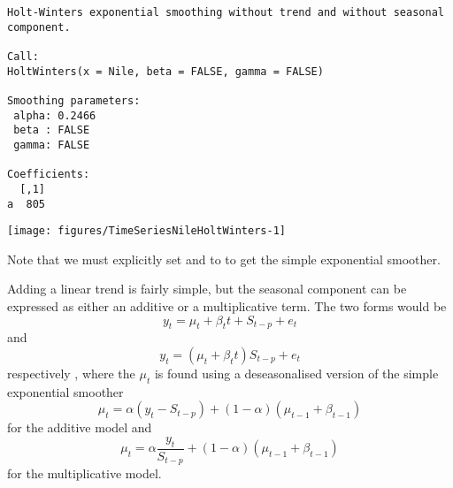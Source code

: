 \begin{knitrout}
\color{fgcolor}\begin{kframe}
\begin{alltt}
\hlstd{> } \hlkwb{=}  \hlstd{=}\hlstd{,}  \hlstd{=} \hlstd{)}
\hlstd{> }
\end{alltt}
\begin{verbatim}
Holt-Winters exponential smoothing without trend and without seasonal component.

Call:
HoltWinters(x = Nile, beta = FALSE, gamma = FALSE)

Smoothing parameters:
 alpha: 0.2466
 beta : FALSE
 gamma: FALSE

Coefficients:
  [,1]
a  805
\end{verbatim}
\begin{alltt}
\hlstd{> }
\end{alltt}
\end{kframe}
\texttt{[image: figures/TimeSeriesNileHoltWinters-1]} 

\end{knitrout}
Note that we must explicitly set  and  to  to get the simple exponential smoother. 
 
 
Adding a linear trend is fairly simple, but the seasonal component can be expressed as either an additive or a multiplicative term. The two forms would be 
$$y_t = \mu_t + \beta_t t +S_{t-p} + e_t$$ 
and 
$$y_t = (\mu_t + \beta_t t) S_{t-p} + e_t$$ 
respectively , where the $\mu_t$ is found using a deseasonalised version of the simple exponential smoother 
$$\mu_t = \alpha (y_t - S_{t-p}) + (1-\alpha) (\mu_{t-1} + \beta_{t-1})$$ 
for the additive model and 
$$\mu_t = \alpha \frac{y_t }{ S_{t-p}} + (1-\alpha) (\mu_{t-1} + \beta_{t-1})$$ 
for the multiplicative model. 
 
